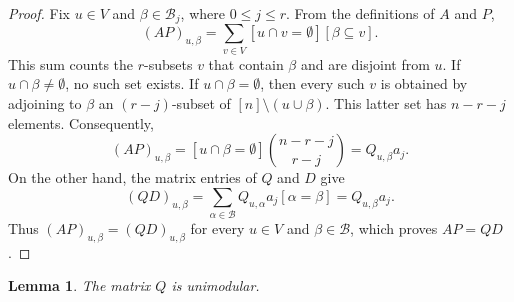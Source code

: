 \documentclass[11pt,reqno]{amsart}
\theoremstyle{plain}
\newtheorem{lemma}[theorem]{Lemma}
\theoremstyle{definition}
\theoremstyle{remark}
\begin{document}
\begin{proof}
Fix $u\in V$ and $\beta\in\mathcal B_j$, where $0\le j\le r$. From the
definitions of $A$ and $P$,
\[
  (AP)_{u,\beta}
  =
  \sum_{v\in V}
  [u\cap v=\emptyset][\beta\subseteq v].
\]
This sum counts the $r$-subsets $v$ that contain $\beta$ and are disjoint
from $u$. If $u\cap\beta\ne\emptyset$, no such set exists. If
$u\cap\beta=\emptyset$, then every such $v$ is obtained by adjoining to
$\beta$ an $(r-j)$-subset of $[n]\setminus(u\cup\beta)$. This latter set has
$n-r-j$ elements. Consequently,
\[
  (AP)_{u,\beta}
  =
  [u\cap\beta=\emptyset]\binom{n-r-j}{r-j}
  =
  Q_{u,\beta}a_j.
\]
On the other hand, the matrix entries of $Q$ and $D$ give
\[
  (QD)_{u,\beta}
  =
  \sum_{\alpha\in\mathcal B}Q_{u,\alpha}a_j[\alpha=\beta]
  =
  Q_{u,\beta}a_j.
\]
Thus $(AP)_{u,\beta}=(QD)_{u,\beta}$ for every $u\in V$ and
$\beta\in\mathcal B$, which proves $AP=QD$.
\end{proof}

\begin{lemma}\label{lem:bier-mobius}
The matrix $Q$ is unimodular.
\end{lemma}
\end{document}
